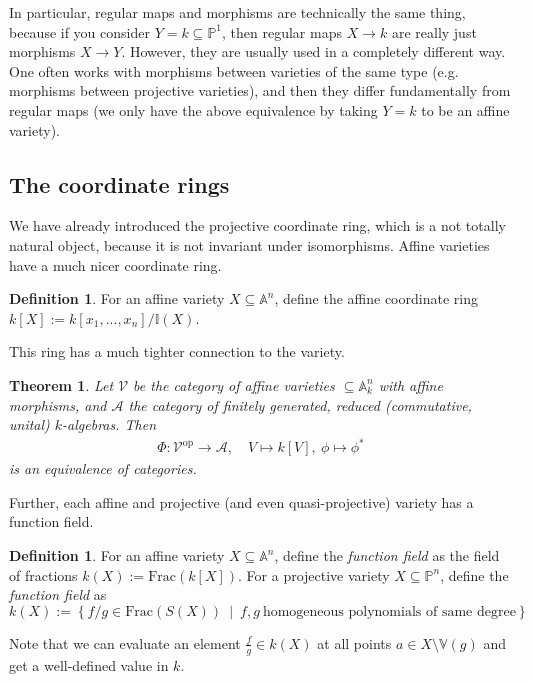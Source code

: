 \documentclass{scrartcl}
\newcommand{\I}{\mathbb{I}}
\newcommand{\V}{\mathbb{V}}
\newtheorem{theorem}[prop]{Theorem}
\theoremstyle{definition}
\newtheorem{definition}[prop]{Definition}
\begin{document}
In particular, regular maps and morphisms are technically the same thing, because if you consider $Y = k \subseteq \mathbb{P}^1$, then regular maps $X \to k$ are really just morphisms $X \to Y$.
However, they are usually used in a completely different way.
One often works with morphisms between varieties of the same type (e.g. morphisms between projective varieties), and then they differ fundamentally from regular maps (we only have the above equivalence by taking $Y = k$ to be an affine variety).

\subsection{The coordinate rings}
We have already introduced the projective coordinate ring, which is a not totally natural object, because it is not invariant under isomorphisms.
Affine varieties have a much nicer coordinate ring.
\begin{definition}
    For an affine variety $X \subseteq \mathbb{A}^n$, define the affine coordinate ring $k[X] := k[x_1, ..., x_n] / \I(X)$.
\end{definition}
This ring has a much tighter connection to the variety.
\begin{theorem}
    Let $\mathcal{V}$ be the category of affine varieties $\subseteq \mathbb{A}_k^n$ with affine morphisms, and $\mathcal{A}$ the category of finitely generated, reduced (commutative, unital) $k$-algebras.
    Then
    \begin{align*}
        \Phi: \mathcal{V}^{\mathrm{op}} \to \mathcal{A}, \quad V \mapsto k[V], \ \phi \mapsto \phi^*
    \end{align*}
    is an equivalence of categories.
\end{theorem}
Further, each affine and projective (and even quasi-projective) variety has a function field.
\begin{definition}
    For an affine variety $X \subseteq \mathbb{A}^n$, define the \emph{function field} as the field of fractions $k(X) := \mathrm{Frac}(k[X])$.
    For a projective variety $X \subseteq \mathbb{P}^n$, define the \emph{function field} as
    \begin{equation*}
        k(X) := \left\{ f/g \in \mathrm{Frac}(S(X)) \ \middle| \ f, g \ \text{homogeneous polynomials of same degree} \right\}
    \end{equation*}
\end{definition}
Note that we can evaluate an element $\frac f g \in k(X)$ at all points $a \in X \setminus \V(g)$ and get a well-defined value in $k$.
\end{document}
